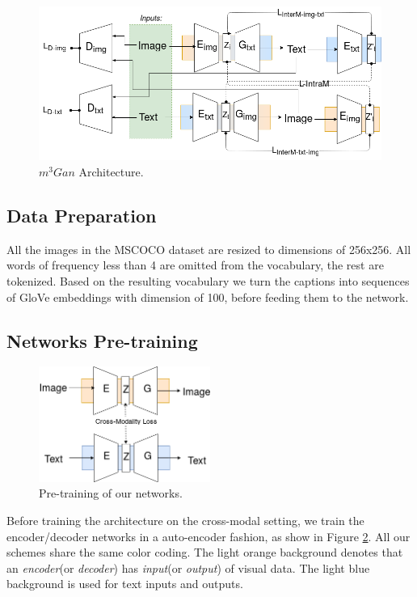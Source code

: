 \documentclass[twocolumn]{article}
\begin{document}
\begin{figure}
  \includegraphics[width=\textwidth]{media/mmmGanwide}
  \caption{$m^3Gan$ Architecture.}
  \label{arch}
\end{figure}


\subsection{Data Preparation}

All the images in the MSCOCO dataset are resized to dimensions of 256x256. All words of frequency less than 4 are omitted from the vocabulary, the rest are tokenized. Based on the resulting vocabulary we turn the captions into sequences of GloVe embeddings\cite{pennington2014glove} with dimension of 100, before feeding them to the network.

\subsection{Networks Pre-training}

\begin{figure}
  \includegraphics[width=0.5\textwidth]{media/pretraining}
  \caption{Pre-training of our networks.}
  \label{pretrain}
\end{figure}


Before training the architecture on the cross-modal setting, we train the encoder/decoder networks in a auto-encoder fashion, as show in Figure \ref{pretrain}.
All our schemes share the same color coding. The light orange background denotes that an \textit{encoder}(or \textit{decoder}) has \textit{input}(or \textit{output}) of visual data. The light blue background is used for text inputs and outputs.
\end{document}
